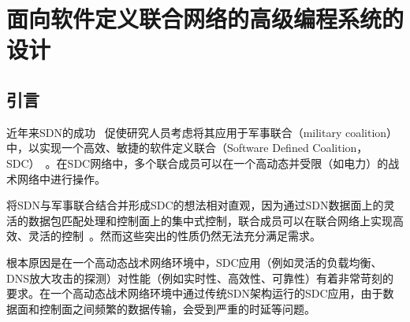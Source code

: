 \chapter{面向软件定义联合网络的高级编程系统的设计}

\section{引言}

近年来SDN的成功~\cite{swan, b4, edgefabric} 促使研究人员考虑将其应用于军事联合（military coalition）中，以实现一个高效、敏捷的软件定义联合（Software Defined Coalition，SDC）~\cite{vinod-sdc}。在SDC网络中，多个联合成员可以在一个高动态并受限（如电力）的战术网络中进行操作。

%

将SDN与军事联合结合并形成SDC的想法相对直观，因为通过SDN数据面上的灵活的数据包匹配处理和控制面上的集中式控制，联合成员可以在联合网络上实现高效、灵活的控制~\cite{P4, rmt}。然而这些突出的性质仍然无法充分满足需求。


根本原因是在一个高动态战术网络环境中，SDC应用（例如灵活的负载均衡、DNS放大攻击的探测）对性能（例如实时性、高效性、可靠性）有着非常苛刻的要求。在一个高动态战术网络环境中通过传统SDN架构运行的SDC应用，由于数据面和控制面之间频繁的数据传输，会受到严重的时延等问题。


